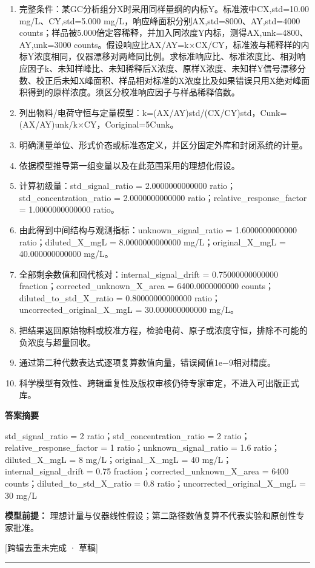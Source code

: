 \documentclass[UTF8,11pt,a4paper]{ctexart}
\begin{document}
\begin{enumerate}
\item 完整条件：某GC分析组分X时采用同样量纲的内标Y。标准液中CX,std=10.00 mg/L、CY,std=5.000 mg/L，响应峰面积分别AX,std=8000、AY,std=4000 counts；样品被5.000倍定容稀释，并加入同浓度Y内标，测得AX,unk=4800、AY,unk=3000 counts。假设响应比AX/AY=k×CX/CY，标准液与稀释样的内标Y浓度相同，仪器漂移对两峰同比例。求标准响应比、标准浓度比、相对响应因子k、未知样峰比、未知稀释后X浓度、原样X浓度、未知样Y信号漂移分数、校正后未知X峰面积、样品相对标准的X浓度比及如果错误只用X绝对峰面积得到的原样浓度。须区分校准响应因子与样品稀释倍数。
\item 列出物料/电荷守恒与定量模型：k=(AX/AY)std/(CX/CY)std，Cunk=(AX/AY)unk/k×CY，Coriginal=5Cunk。
\item 明确测量单位、形式价态或标准态定义，并区分固定外库和封闭系统的计量。
\item 依据模型推导第一组变量以及在此范围采用的理想化假设。
\item 计算初级量：std\_signal\_ratio = 2.0000000000000 ratio；std\_concentration\_ratio = 2.0000000000000 ratio；relative\_response\_factor = 1.0000000000000 ratio。
\item 由此得到中间结构与观测指标：unknown\_signal\_ratio = 1.6000000000000 ratio；diluted\_X\_mgL = 8.0000000000000 mg/L；original\_X\_mgL = 40.000000000000 mg/L。
\item 全部剩余数值和回代核对：internal\_signal\_drift = 0.75000000000000 fraction；corrected\_unknown\_X\_area = 6400.0000000000 counts；diluted\_to\_std\_X\_ratio = 0.80000000000000 ratio；uncorrected\_original\_X\_mgL = 30.000000000000 mg/L。
\item 把结果返回原始物料或校准方程，检验电荷、原子或浓度守恒，排除不可能的负浓度与超量回收。
\item 通过第二种代数表达式逐项复算数值向量，错误阈值1e−9相对精度。
\item 科学模型有效性、跨辑重复性及版权审核仍待专家审定，不进入可出版正式库。
\end{enumerate}
\noindent\textbf{答案摘要}\par
std\_signal\_ratio = 2 ratio；std\_concentration\_ratio = 2 ratio；relative\_response\_factor = 1 ratio；unknown\_signal\_ratio = 1.6 ratio；diluted\_X\_mgL = 8 mg/L；original\_X\_mgL = 40 mg/L；internal\_signal\_drift = 0.75 fraction；corrected\_unknown\_X\_area = 6400 counts；diluted\_to\_std\_X\_ratio = 0.8 ratio；uncorrected\_original\_X\_mgL = 30 mg/L\par
\noindent\textbf{模型前提：}
理想计量与仪器线性假设；第二路径数值复算不代表实验和原创性专家批准。\par
\noindent\textcolor{red!65!black}{[跨辑去重未完成 · 草稿]} \par
\medskip\hrule\medskip
{}
\end{document}
